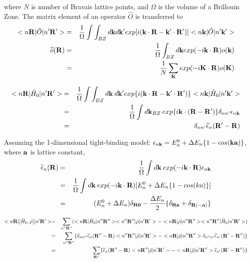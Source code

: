 \documentclass[aps,prb,preprint]{revtex4-1}
\begin{document}
\begin{appendix}
where $N$ is number of Bravais lattice points, and $\Omega$ is the volume of a Brillouin Zone. 
The matrix element of an operator $\hat{O}$ is transferred to 
\begin{eqnarray}
 < n{\bf R}| \hat{O} |n'{\bf R'}> &=& \frac{1}{\Omega} \int \int_{BZ} d{\bf k} d{\bf k'} exp[i ({\bf k} \cdot {\bf R}- {\bf k'} \cdot {\bf R'} ) ]< n{\bf k}| \hat{O} |n'{\bf k'}>  \\
 \widetilde{o}({\bf R}) &=& \frac{1}{\Omega} \int_{BZ} d{\bf k}  exp( - i{\bf k} \cdot {\bf R} ) o({\bf k}) \nonumber\\
 &=& \frac{1}{N} \sum_{\bf K}  exp( - i{\bf K} \cdot {\bf R} ) o({\bf K})
\end{eqnarray} 

\begin{eqnarray}
 < n{\bf R}| \hat{H}_0 |n'{\bf R'}> &=& \frac{1}{\Omega} \int \int_{BZ} d{\bf k} \:d{\bf k'} exp\{i ({\bf k} \cdot {\bf R}- {\bf k'} \cdot {\bf R'} ) \}< n{\bf k}| \hat{H}_0 |n'{\bf k'}>  \nonumber \nonumber \\
&=& \frac{1}{\Omega} \int d{\bf k}_{BZ} \: exp\{i{\bf k} \cdot ({\bf R- R'} ) \} \delta_{nn'} \epsilon_{n{\bf k}} \nonumber\\
&=& \delta_{nn'} \widetilde{\epsilon}_{n}({\bf R' - R} )  
\end{eqnarray} 

Assuming the 1-dimensional tight-binding model: $\epsilon_{n{\bf k}}= E^0_n + \Delta E_n \{1-cos({\bf ka})\}$, where $ \bf a$ is lattice constant,  
\begin{eqnarray}
 \widetilde{\epsilon}_{n}({\bf R} ) &=& \frac{1}{\Omega} \int d{\bf k} \: exp( -i{\bf k} \cdot {\bf R} ) \epsilon_{n{\bf k}} \nonumber \\
&=& \frac{1}{\Omega} \int d{\bf k} \: exp( -i{\bf k} \cdot {\bf R} ) [E^0_n + \Delta E_n \{1-cos(ka)\} ] \nonumber\\
&=& (E^0_n + \Delta E_n)\delta_{\bf R 0} - \frac{\Delta E_n}{2} \{ \delta_{\bf R a} + \delta_{\bf R(-a)} \} \\
\end{eqnarray} 

\begin{eqnarray}
 < n{\bf R}| [\hat{H}_0, \hat{\rho} ]|n'{\bf R'}> = && \sum_{n''{\bf R''}} ( < n{\bf R}| \hat{H}_0 |n''{\bf R''}> < n''{\bf R''}|\hat{\rho} |n'{\bf R'}> -< n{\bf R}| \hat{\rho}|n''{\bf R''}> < n''{\bf R''}|\hat{H}_0 |n'{\bf R'}> ) \nonumber \\
 = && \sum_{n''{\bf R''}} \{ \delta_{nn''} \widetilde{\epsilon}_{n}({\bf R''- R} )  < n''{\bf R''}|\hat{\rho} |n'{\bf R'}> - < n{\bf R}| \hat{\rho}|n''{\bf R''}> \delta_{n''n'} \widetilde{\epsilon}_{n'}({\bf R'- R''} )   \} \nonumber \\
  = && \sum_{\bf R''} \{ \widetilde{\epsilon}_{n}({\bf R''- R} )  < n{\bf R''}|\hat{\rho} |n'{\bf R'}> - < n{\bf R}| \hat{\rho}|n'{\bf R''}> \widetilde{\epsilon}_{n'}({\bf R'- R''} )   \} \nonumber \\
\end{eqnarray} 


\end{appendix}
\end{document}

